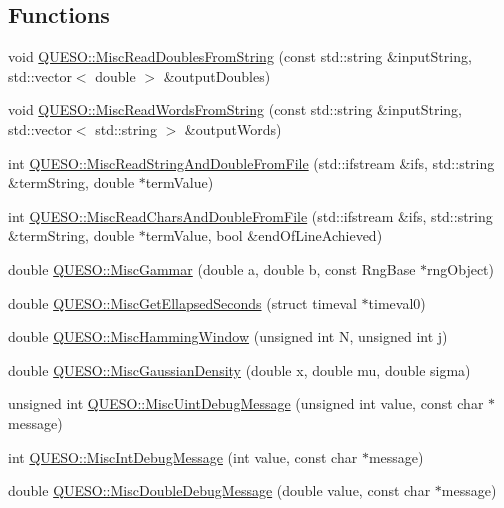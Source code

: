 \subsection*{Functions}
\begin{DoxyCompactItemize}
\item 
void \hyperlink{namespace_q_u_e_s_o_ac3fab438679d1dc864f8d629881dad2e}{Q\-U\-E\-S\-O\-::\-Misc\-Read\-Doubles\-From\-String} (const std\-::string \&input\-String, std\-::vector$<$ double $>$ \&output\-Doubles)
\item 
void \hyperlink{namespace_q_u_e_s_o_a9e0f636bad9d30e3d0fa1589a61d0567}{Q\-U\-E\-S\-O\-::\-Misc\-Read\-Words\-From\-String} (const std\-::string \&input\-String, std\-::vector$<$ std\-::string $>$ \&output\-Words)
\item 
int \hyperlink{namespace_q_u_e_s_o_af0fc61c58d0ca592fa172eeab540d39c}{Q\-U\-E\-S\-O\-::\-Misc\-Read\-String\-And\-Double\-From\-File} (std\-::ifstream \&ifs, std\-::string \&term\-String, double $\ast$term\-Value)
\item 
int \hyperlink{namespace_q_u_e_s_o_a575d3153d82b7df3d78ad5cfbf2b83b7}{Q\-U\-E\-S\-O\-::\-Misc\-Read\-Chars\-And\-Double\-From\-File} (std\-::ifstream \&ifs, std\-::string \&term\-String, double $\ast$term\-Value, bool \&end\-Of\-Line\-Achieved)
\item 
double \hyperlink{namespace_q_u_e_s_o_a4f268914e653262df98af86aeb33285f}{Q\-U\-E\-S\-O\-::\-Misc\-Gammar} (double a, double b, const Rng\-Base $\ast$rng\-Object)
\item 
double \hyperlink{namespace_q_u_e_s_o_a424bc33f2e6e287fd468408d14b772ee}{Q\-U\-E\-S\-O\-::\-Misc\-Get\-Ellapsed\-Seconds} (struct timeval $\ast$timeval0)
\item 
double \hyperlink{namespace_q_u_e_s_o_a48c1ad47c8bebad572842726591e9d3f}{Q\-U\-E\-S\-O\-::\-Misc\-Hamming\-Window} (unsigned int N, unsigned int j)
\item 
double \hyperlink{namespace_q_u_e_s_o_a0f94e9b1e8f415c389f180d4a75c5591}{Q\-U\-E\-S\-O\-::\-Misc\-Gaussian\-Density} (double x, double mu, double sigma)
\item 
unsigned int \hyperlink{namespace_q_u_e_s_o_a2f606febc1ff24dc4b427c68b4bb845e}{Q\-U\-E\-S\-O\-::\-Misc\-Uint\-Debug\-Message} (unsigned int value, const char $\ast$message)
\item 
int \hyperlink{namespace_q_u_e_s_o_ae9763e7b3ff5f5e2a19bb440f7b7bb4e}{Q\-U\-E\-S\-O\-::\-Misc\-Int\-Debug\-Message} (int value, const char $\ast$message)
\item 
double \hyperlink{namespace_q_u_e_s_o_a976de592e2133af50b80f6aad1352165}{Q\-U\-E\-S\-O\-::\-Misc\-Double\-Debug\-Message} (double value, const char $\ast$message)

\end{DoxyCompactItemize}
